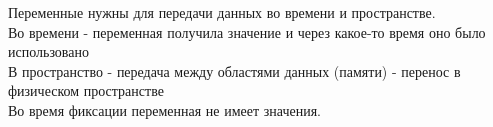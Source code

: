 Переменные нужны для передачи данных во времени и пространстве.\\
Во времени - переменная получила значение и через какое-то время оно было использовано\\
В пространство - передача между областями данных (памяти) - перенос в физическом пространстве\\

Во время фиксации переменная не имеет значения.




